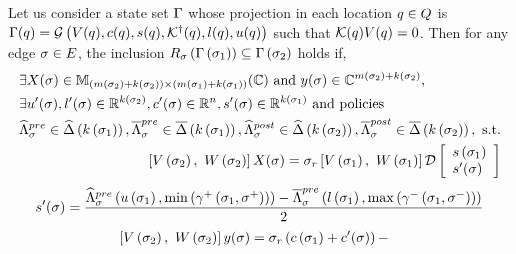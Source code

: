 \begin{lemma}
  Let us consider a state set $\Gamma$ whose projection in each
  location $q\in Q$ is $\Gamma(q) =
  \mathcal{G}\left(V(q),c(q),s(q),\mathcal{K}^\dagger(q),l(q),u(q)\right)$
  such that $\mathcal{K}(q)V(q) = 0$.  Then for any edge
  $\sigma\in E$, the inclusion
  $R_{\sigma}\left(\Gamma\left(\sigma_{1}\right)\right)
  \subseteq \Gamma\left(\sigma_{2}\right)$ holds if,
\begin{align}
\begin{split}
& \exists X(\sigma)\in
\mathbb{M}_{\left(m\left(\sigma_{2}\right)+k\left(\sigma_{2}\right)\right)\times \left(m\left(\sigma_{1}\right)+k\left(\sigma_{1}\right)\right)}(\mathbb{\mathbb{C}})~\text{and}~y(\sigma)\in
\mathbb{C}^{m\left(\sigma_{2}\right)+k\left(\sigma_{2}\right)},\\
& \exists u^\prime(\sigma),l^\prime(\sigma)\in \mathbb{R}^{k\left(\sigma_{2}\right)}, c^\prime(\sigma)\in\mathbb{R}^n,s^\prime(\sigma)\in\mathbb{R}^{k\left(\sigma_{1}\right)}~\text{and policies}\\
&\widehat{\Lambda}_{\sigma}^{pre}\in\widehat{\Delta}\left(k\left(\sigma_{1}\right)\right),\overline{\Lambda}_{\sigma}^{pre}\in\overline{\Delta}\left(k\left(\sigma_{1}\right)\right),
\widehat{\Lambda}_{\sigma}^{post}\in\widehat{\Delta}\left(k\left(\sigma_{2}\right)\right),\overline{\Lambda}_{\sigma}^{post}\in\overline{\Delta}\left(k\left(\sigma_{2}\right)\right),~\text{s.t.}
\end{split}\\
\begin{split}
& \left[V\left(\sigma_{2}\right),~W\left(\sigma_{2}\right)\right]X(\sigma) = \sigma_r\left[V\left(\sigma_{1}\right),~W\left(\sigma_{1}\right)\right]\mathcal{D}
\left[\begin{array}{l}{s\left(\sigma_{1}\right)}\\{s^\prime(\sigma)} \end{array}\right]\\
\end{split}
\end{align}
\begin{align}
\begin{split}
s^\prime(\sigma) = \frac{\widehat{\Lambda}_{\sigma}^{pre}\left(u\left(\sigma_{1}\right),\min\left(\gamma^+\left(\sigma_{1},\sigma^+\right)\right)\right)-
\overline{\Lambda}_{\sigma}^{pre}\left(l\left(\sigma_{1}\right),\max\left(\gamma^-\left(\sigma_{1},\sigma^-\right)\right)\right)}{2}\\
\end{split}
\end{align}
\begin{align}
\begin{split}
& \lt[V\lt(\postloc{\edge}\rt),~W\lt(\postloc{\edge}\rt)\rt]y(\edge) = \reset{\edge}\lt(c\lt(\preloc{\edge}\rt)+c^\pr(\edge)\rt)- 

\end{split}
\end{align}
\end{lemma}
